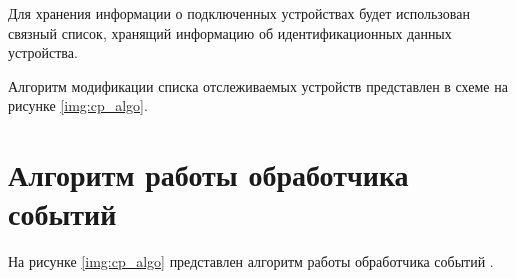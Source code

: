 Для хранения информации о подключенных устройствах будет использован связный список, хранящий информацию об идентификационных данных устройства.

Алгоритм модификации списка отслеживаемых устройств представлен в схеме на рисунке \ref{img:cp_algo}.

\section{Алгоритм работы обработчика событий}

На рисунке \ref{img:cp_algo} представлен алгоритм работы обработчика событий .

